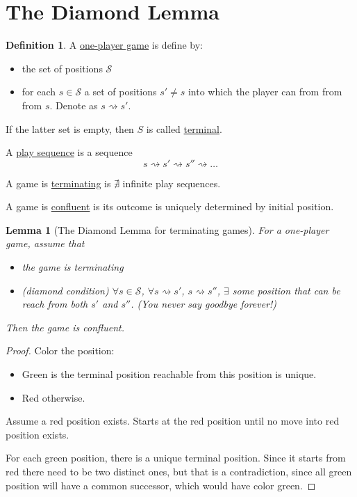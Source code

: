 \documentclass{report}
\newtheorem{lemma}{Lemma}[section]
\theoremstyle{definition}
\newtheorem{definition}{Definition}[section]
\theoremstyle{remark}
\numberwithin{equation}{section}
\begin{document}
\section{The Diamond Lemma}
\begin{definition}
    A \underline{one-player game} is define by:
    \begin{itemize}
        \item the set of positions $\mathcal{S}$
        \item for each $s \in \mathcal{S}$ a set of positions $s' \neq s$ into which the player can from from from $s$. Denote as $s \rightsquigarrow s'$.
    \end{itemize}
    If the latter set is empty, then $S$ is called \underline{terminal}.

    A \underline{play sequence} is a sequence
    \[s \rightsquigarrow s' \rightsquigarrow s'' \rightsquigarrow \ldots\]

    A game is \underline{terminating} is $\nexists$ infinite play sequences.

    A game is \underline{confluent} is its outcome is uniquely determined by initial position.
\end{definition}

\begin{lemma}[The Diamond Lemma for terminating games]
    For a one-player game, assume that
    \begin{itemize}
        \item the game is terminating
        \item[$\diamond$](diamond condition) $\forall s \in \mathcal{S}$, $\forall s \rightsquigarrow s'$, $s \rightsquigarrow s''$, $\exists$ some position that can be reach from both $s'$ and $s''$. (You never say goodbye forever!)
    \end{itemize}
    Then the game is confluent.
\end{lemma}
\begin{proof}
    Color the position:
    \begin{itemize}
        \item[\textcolor{green}\textbullet] Green is the terminal position reachable from this position is unique.
        \item[\textcolor{red}\textbullet] Red otherwise.
    \end{itemize}
    Assume a red position exists. Starts at the red position until no move into red position exists. 

    For each green position, there is a unique terminal position. Since it starts from red there need to be two distinct ones, but that is a contradiction, since all green position will have a common successor, which would have color green.
\end{proof}
\end{document}
